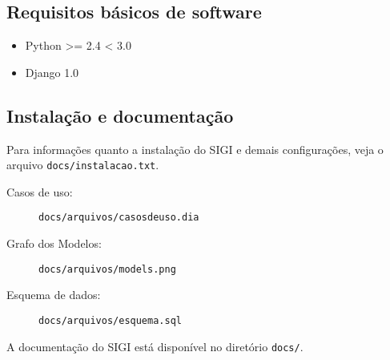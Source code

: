 
\hypertarget{requisitos-b-sicos-de-software}{}
\subsection*{Requisitos básicos de software}
\begin{itemize}
\item {} 
Python {\textgreater}= 2.4 {\textless} 3.0

\item {} 
Django 1.0

\end{itemize}



\hypertarget{instala-o-e-documenta-o}{}
\subsection*{Instalação e documentação}

Para informações quanto a instalação do SIGI e demais configurações,
veja o arquivo \texttt{docs/instalacao.txt}.
\begin{description}
\item[{Casos de uso}:] %

\texttt{docs/arquivos/casosdeuso.dia}

\item[{Grafo dos Modelos}:] %

\texttt{docs/arquivos/models.png}

\item[{Esquema de dados}:] %

\texttt{docs/arquivos/esquema.sql}

\end{description}

A documentação do SIGI está disponível no diretório \texttt{docs/}.



